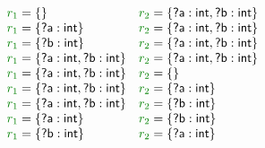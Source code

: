 \begin{figure}
\begin{equation*}
\begin{array}{ll}
 \cclrd{r_1} = \{ \} & \cclrd{r_2} = \{ \ident{?a}:\ident{int}, \ident{?b}:\ident{int} \} \\
 \cclrd{r_1} = \{ \ident{?a}:\ident{int} \} & \cclrd{r_2} = \{ \ident{?a}:\ident{int}, \ident{?b}:\ident{int} \} \\
 \cclrd{r_1} = \{ \ident{?b}:\ident{int} \} & \cclrd{r_2} = \{ \ident{?a}:\ident{int}, \ident{?b}:\ident{int} \} \\
 \cclrd{r_1} = \{ \ident{?a}:\ident{int}, \ident{?b}:\ident{int} \} & \cclrd{r_2} = \{ \ident{?a}:\ident{int}, \ident{?b}:\ident{int} \} \\
 \cclrd{r_1} = \{ \ident{?a}:\ident{int}, \ident{?b}:\ident{int} \} & \cclrd{r_2} = \{ \}\\
 \cclrd{r_1} = \{ \ident{?a}:\ident{int}, \ident{?b}:\ident{int} \} & \cclrd{r_2} = \{ \ident{?a}:\ident{int} \}\\
 \cclrd{r_1} = \{ \ident{?a}:\ident{int}, \ident{?b}:\ident{int} \} & \cclrd{r_2} = \{ \ident{?b}:\ident{int} \}\\
 \cclrd{r_1} = \{ \ident{?a}:\ident{int} \} & \cclrd{r_2} = \{ \ident{?b}:\ident{int} \} \\
 \cclrd{r_1} = \{ \ident{?b}:\ident{int} \} & \cclrd{r_2} = \{ \ident{?a}:\ident{int} \} \\
\end{array}
\end{equation*}

\label{fig:appendixa-impl}
\end{figure}


